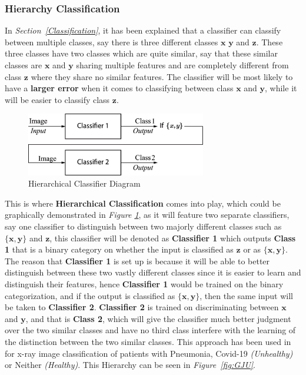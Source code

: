 \documentclass[12pt]{extarticle}
\begin{document}
	\subsubsection{Hierarchy Classification}\label{Hierarchy_Class}
	In \emph{Section~\ref{Classification}}, it has been explained that a classifier can classify between multiple classes, say there is three different classes $\bm{x}$ $\bm{y}$ and $\bm{z}$. These three classes have two classes which are quite similar, say that these similar classes are $\bm{x}$ and $\bm{y}$ sharing multiple features and are completely different from class $\bm{z}$ where they share no similar features. The classifier will be most likely to have a \textbf{larger error} when it comes to classifying between class $\bm{x}$ and $\bm{y}$, while it will be easier to classify class $\bm{z}$.\\[5mm]
	\begin{figure}[h]
		\centering
		\includegraphics[width=0.7\textwidth]{pics/Figures/Hierarchical_Classifier_Block_Diagram.eps}
		\caption{\small{Hierarchical Classifier Diagram}}
		\label{fig:Hierarchical Classifier}
	\end{figure}
	This is where \textbf{Hierarchical Classification} comes into play, which could be graphically demonstrated in \emph{Figure \ref{fig:Hierarchical Classifier}}, as it will feature two separate classifiers, say one classifier to distinguish between two majorly different classes such as $\bm{\{x,y\}}$ and $\bm{z}$, this classifier will be denoted as \textbf{Classifier 1} which outputs \textbf{Class 1} that is a binary category on whether the input is classified as $\bm{z}$ or as $\bm{\{x,y\}}$. The reason that \textbf{Classifier 1} is set up is because it will be able to better distinguish between these two vastly different classes since it is easier to learn and distinguish their features, hence \textbf{Classifier 1} would be trained on the binary categorization, and if the output is classified as $\bm{\{x,y\}}$, then the same input will be taken to \textbf{Classifier 2}. \textbf{Classifier 2} is trained on discriminating between $\bm{x}$ and $\bm{y}$, and that is \textbf{Class 2}, which will give the classifier much better judgment over the two similar classes and have no third class interfere with the learning of the distinction between the two similar classes. This approach has been used in \cite{GJU} for x-ray image classification of patients with Pneumonia, Covid-19 \emph{(Unhealthy)} or Neither \emph{(Healthy)}. This Hierarchy can be seen in \emph{Figure~\ref{fig:GJU}}.
\end{document}
